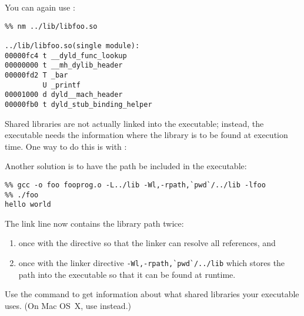 
You can again use :
\begin{verbatim}
%% nm ../lib/libfoo.so 

../lib/libfoo.so(single module):
00000fc4 t __dyld_func_lookup
00000000 t __mh_dylib_header
00000fd2 T _bar
         U _printf
00001000 d dyld__mach_header
00000fb0 t dyld_stub_binding_helper
\end{verbatim}

Shared libraries are not actually linked into the executable;
instead, the executable needs the information where the library
is to be found at execution time. One way to do this is with
:


Another solution is to have the path be included in the executable:
\begin{verbatim}
%% gcc -o foo fooprog.o -L../lib -Wl,-rpath,`pwd`/../lib -lfoo
%% ./foo
hello world
\end{verbatim}
The link line now contains the library path twice:
\begin{enumerate}
\item once with the  directive so that the linker can resolve
  all references, and
\item once with the linker directive \verb+-Wl,-rpath,`pwd`/../lib+ which
  stores the path into the executable so that it can be found at runtime.
\end{enumerate}

Use the command  to get information about what shared libraries
your executable uses. (On Mac OS~X, use  instead.)




